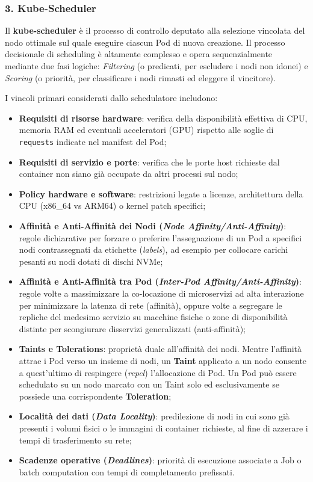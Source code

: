\documentclass[11pt, a4paper]{article}
\begin{document}
\subsubsection{3. Kube-Scheduler}
Il \textbf{kube-scheduler} è il processo di controllo deputato alla selezione vincolata del nodo ottimale sul quale eseguire ciascun Pod di nuova creazione. Il processo decisionale di scheduling è altamente complesso e opera sequenzialmente mediante due fasi logiche: \emph{Filtering} (o predicati, per escludere i nodi non idonei) e \emph{Scoring} (o priorità, per classificare i nodi rimasti ed eleggere il vincitore).

I vincoli primari considerati dallo schedulatore includono:
\begin{itemize}[noitemsep]
    \item \textbf{Requisiti di risorse hardware}: verifica della disponibilità effettiva di CPU, memoria RAM ed eventuali acceleratori (GPU) rispetto alle soglie di \texttt{requests} indicate nel manifest del Pod;
    \item \textbf{Requisiti di servizio e porte}: verifica che le porte host richieste dal container non siano già occupate da altri processi sul nodo;
    \item \textbf{Policy hardware e software}: restrizioni legate a licenze, architettura della CPU (x86\_64 vs ARM64) o kernel patch specifici;
    \item \textbf{Affinità e Anti-Affinità dei Nodi (\emph{Node Affinity/Anti-Affinity})}: regole dichiarative per forzare o preferire l'assegnazione di un Pod a specifici nodi contrassegnati da etichette (\emph{labels}), ad esempio per collocare carichi pesanti su nodi dotati di dischi NVMe;
    \item \textbf{Affinità e Anti-Affinità tra Pod (\emph{Inter-Pod Affinity/Anti-Affinity})}: regole volte a massimizzare la co-locazione di microservizi ad alta interazione per minimizzare la latenza di rete (affinità), oppure volte a segregare le repliche del medesimo servizio su macchine fisiche o zone di disponibilità distinte per scongiurare disservizi generalizzati (anti-affinità);
    \item \textbf{Taints e Tolerations}: proprietà duale all'affinità dei nodi. Mentre l'affinità attrae i Pod verso un insieme di nodi, un \textbf{Taint} applicato a un nodo consente a quest'ultimo di respingere (\emph{repel}) l'allocazione di Pod. Un Pod può essere schedulato su un nodo marcato con un Taint solo ed esclusivamente se possiede una corrispondente \textbf{Toleration};
    \item \textbf{Località dei dati (\emph{Data Locality})}: predilezione di nodi in cui sono già presenti i volumi fisici o le immagini di container richieste, al fine di azzerare i tempi di trasferimento su rete;
    \item \textbf{Scadenze operative (\emph{Deadlines})}: priorità di esecuzione associate a Job o batch computation con tempi di completamento prefissati.
\end{itemize}
\end{document}
